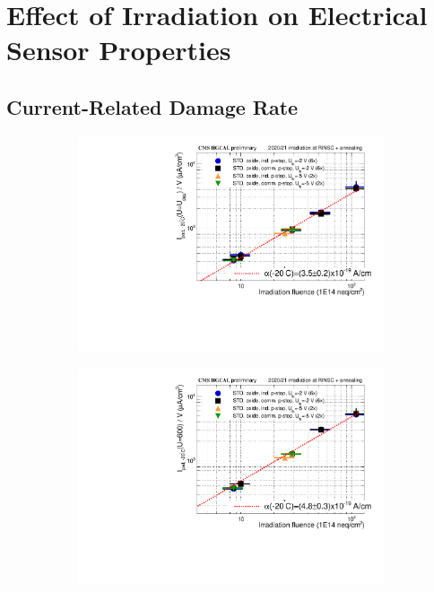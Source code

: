 \section{Effect of Irradiation on Electrical Sensor Properties}
\label{sec:irradiation}

\subsection{Current-Related Damage Rate}
\label{subsec:irradiation_alpha}

\begin{figure}
	\captionsetup[subfigure]{aboveskip=-1pt,belowskip=-1pt}
	\begin{subfigure}[b]{0.49\textwidth}
		\centering
		\includegraphics[width=0.99\textwidth]{plots/alpha/alpha_Udep.pdf}
		\subcaption{
			}
			\label{plot:alpha_Udep}
	\end{subfigure}		
	\hfill
	\centering
	\begin{subfigure}[b]{0.49\textwidth}
		\centering
		\includegraphics[width=0.99\textwidth]{plots/alpha/alpha_600V.pdf}

\end{subfigure}
\end{figure}
